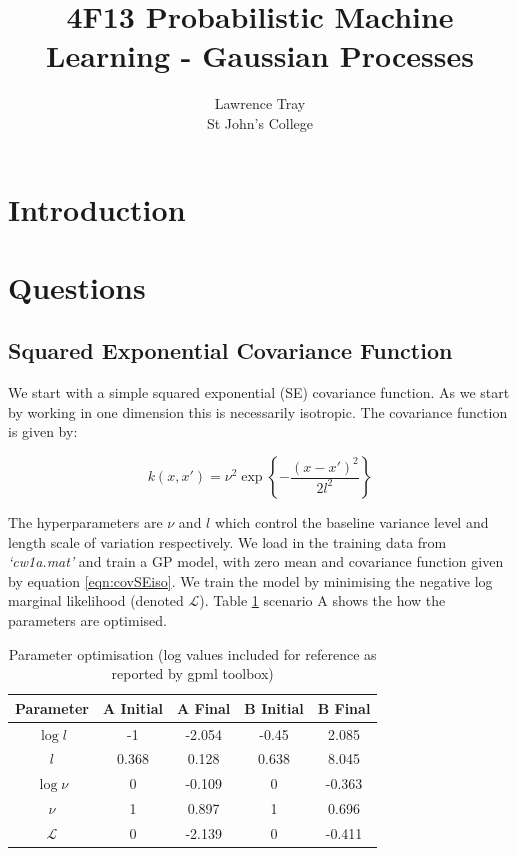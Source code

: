 \documentclass[]{article}
\title{4F13 Probabilistic Machine Learning - Gaussian Processes}
\author{Lawrence Tray \\ St John's College}
\newcommand{\Lcal}{\mathcal{L}}
\begin{document}
\maketitle

\begin{abstract}
\end{abstract}

\section{Introduction}

\section{Questions}
\subsection{Squared Exponential Covariance Function}

We start with a simple squared exponential (SE) covariance function. As we start by working in one dimension this is necessarily isotropic. The covariance function is given by:

\begin{equation}
k(x, x') = \nu^2 \exp\left\{- \frac{(x-x')^2}{2l^2}\right\}
\label{eqn:covSEiso}
\end{equation}

The hyperparameters are $\nu$ and $l$ which control the baseline variance level and length scale of variation respectively. We load in the training data from \textit{`cw1a.mat'} and train a GP model, with zero mean and covariance function given by equation \ref{eqn:covSEiso}. We train the model by minimising the negative log marginal likelihood (denoted $\Lcal$). Table \ref{tab:hyp-opt} scenario A shows the how the parameters are optimised.

\begin{table}[!h]
\centering
\begin{tabular}{c | c c | c c}
	\textbf{Parameter} & \textbf{A Initial} & \textbf{A Final} & \textbf{B Initial} & \textbf{B Final} \\ \hline
	$\log l$           & -1                 & -2.054           & -0.45              & 2.085            \\
	$l$                & 0.368              & 0.128            & 0.638              & 8.045            \\
	$\log \nu$         & 0                  & -0.109           & 0                  & -0.363           \\
	$\nu$              & 1                  & 0.897            & 1                  & 0.696            \\
	$\Lcal$            & 0                  & -2.139           & 0                  & -0.411          
\end{tabular}
\caption{Parameter optimisation (log values included for reference as reported by gpml toolbox)}
\label{tab:hyp-opt}
\end{table}
\end{document}
